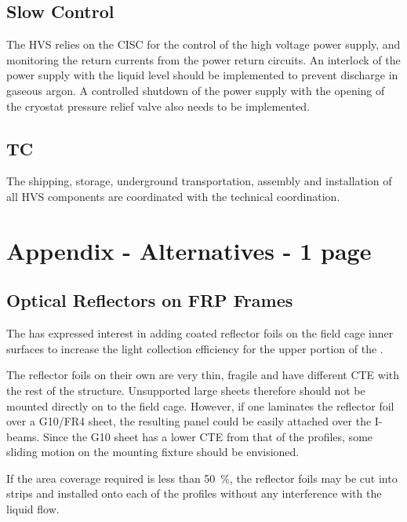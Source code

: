 \subsection{Slow Control}
\label{sec:fddp-hv-intfc-to-cisc}

The HVS relies on the CISC for the control of the high voltage power supply, and monitoring the return currents from the  power return circuits.  An interlock of the  power supply with the liquid level should be implemented to prevent  discharge in gaseous argon.  A controlled shutdown of the  power supply with the opening of the cryostat pressure relief valve also needs to be implemented.

\subsection{TC}
\label{sec:fddp-hv-intfc-to-tc}

The shipping, storage, underground transportation, assembly and installation of all HVS components are coordinated with the technical coordination.


\clearpage

\section{Appendix - Alternatives - 1 page}

\subsection{Optical Reflectors on  FRP Frames}

The \dual {} has expressed interest in adding  coated reflector foils on the field cage inner surfaces to increase the light collection efficiency for the upper portion of the .  

The reflector foils on their own are very thin, fragile and have different CTE with the rest of the  structure. Unsupported large sheets therefore should not be mounted directly on to the field cage.  However, if one laminates the reflector foil over a G10/FR4 sheet, the resulting panel could be easily attached over the  I-beams.  Since the G10 sheet has a lower CTE from that of the  profiles, some sliding motion on the mounting fixture should be envisioned.

If the area coverage required is less than \num{50}~\%, the reflector foils may be cut into strips and  installed onto each of the  profiles without any interference with the liquid flow.

